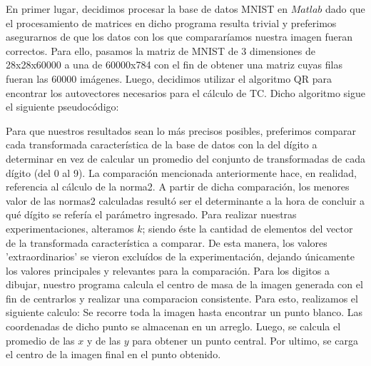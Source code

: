 \documentclass[10pt, a4paper]{article}
\begin{document}
En primer lugar, decidimos procesar la base de datos MNIST en $Matlab$ dado que el procesamiento de matrices en dicho programa resulta trivial y preferimos asegurarnos de que los datos con los que compararíamos nuestra imagen fueran correctos. Para ello, pasamos la matriz de MNIST de 3 dimensiones de 28x28x60000 a una de 60000x784 con el fin de obtener una matriz cuyas filas fueran las 60000 imágenes.\newline
Luego, decidimos utilizar el algoritmo QR para encontrar los autovectores necesarios para el cálculo de TC. Dicho algoritmo sigue el siguiente pseudocódigo:\newline
\newline
{}


Para que nuestros resultados sean lo más precisos posibles, preferimos comparar cada transformada característica de la base de datos con la del dígito a determinar en vez de calcular un promedio del conjunto de transformadas de cada dígito (del 0 al 9). La comparación mencionada anteriormente hace, en realidad, referencia al cálculo de la norma2. A partir de dicha comparación, los menores valor de las normas2 calculadas resultó ser el determinante a la hora de concluir a qué dígito se refería el parámetro ingresado.\newline
\newline
Para realizar nuestras experimentaciones, alteramos $k$; siendo éste la cantidad de elementos del vector de la transformada característica a comparar. De esta manera, los valores 'extraordinarios' se vieron excluídos de la experimentación, dejando únicamente los valores principales y relevantes para la comparación. \newline
\newline
Para los digitos a dibujar, nuestro programa calcula el centro de masa de la imagen generada con el fin de centrarlos y realizar una comparacion consistente. Para esto, realizamos el siguiente calculo:
Se recorre toda la imagen hasta encontrar un punto blanco. Las coordenadas de dicho punto se almacenan en un arreglo. Luego, se calcula el promedio de las $x$ y de las $y$ para obtener un punto central. Por ultimo, se carga el centro de la imagen final en el punto obtenido.
\end{document}
